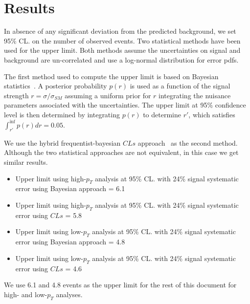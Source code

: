\section{Results}
\label{sec:ssresults}

In absence of any significant deviation from the predicted background, we set 95\% CL. on the number of observed events. 
Two statistical methods have been used for the upper limit. 
Both methods assume the uncertainties on signal and background are un-correlated and use a log-normal distribution for error pdfs. 

The first method used to compute the upper limit is based on Bayesian statistics~\cite{bayesian}.
A posterior probability $p(r)$ is used as a function of the signal strength $r = \sigma/\sigma_{SM}$ 
assuming a uniform prior for $r$ integrating the nuisance parameters associated with the uncertainties.
The upper limit at 95\% confidence level is then determined by integrating $p(r)$ to determine $r'$, 
which satisfies $\int_{r'}^{\inf} p(r) dr = 0.05$.

We use the hybrid frequentist-bayesian $CLs$ approach~\cite{CLSxx} as the second method. 
Although the two statistical approaches are not equivalent, in this case we get similar results. 

\begin{itemize}
\item Upper limit using high-$p_T$ analysis at 95\% CL. with 24\% signal systematic error using Bayesian approach = 6.1  
\item Upper limit using high-$p_T$ analysis at 95\% CL. with 24\% signal systematic error using $CLs$ = 5.8  
\item Upper limit using low-$p_T$ analysis at 95\% CL. with 24\% signal systematic error using Bayesian approach = 4.8  
\item Upper limit using low-$p_T$ analysis at 95\% CL. with 24\% signal systematic error using $CLs$ = 4.6  
\end{itemize}

We use 6.1 and 4.8 events as the upper limit for the rest of this document for high- and low-$p_T$ analyses.
